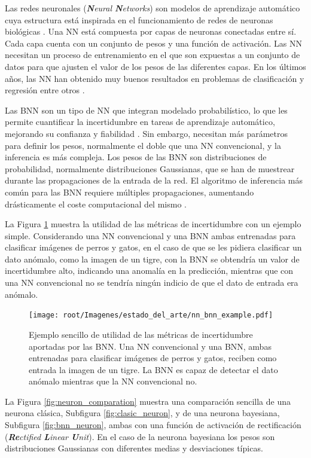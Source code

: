 Las redes neuronales (\textit{\textbf{N}eural \textbf{N}etworks}) son modelos de aprendizaje automático cuya estructura está inspirada en el funcionamiento de redes de neuronas biológicas \cite{deep_learning_nature}. Una NN está compuesta por capas de neuronas conectadas entre sí. Cada capa cuenta con un conjunto de pesos y una función de activación. Las NN necesitan un proceso de entrenamiento en el que son expuestas a un conjunto de datos para que ajusten el valor de los pesos de las diferentes capas. En los últimos años, las NN han obtenido muy buenos resultados en problemas de clasificación y regresión entre otros \cite{cnn_image_survey}.

Las BNN son un tipo de NN que integran modelado probabilístico, lo que les permite cuantificar la incertidumbre en tareas de aprendizaje automático, mejorando su confianza y fiabilidad \cite{bnn_hyper_uncertainty}. Sin embargo, necesitan más parámetros para definir los pesos, normalmente el doble que una NN convencional, y la inferencia es más compleja. Los pesos de las BNN son distribuciones de probabilidad, normalmente distribuciones Gaussianas, que se han de muestrear durante las propagaciones de la entrada de la red. El algoritmo de inferencia más común para las BNN requiere múltiples propagaciones, aumentando drásticamente el coste computacional del mismo \cite{bnn_theory_paper}.

La Figura \ref{fig:bnn_vs_nn_example} muestra la utilidad de las métricas de incertidumbre con un ejemplo simple. Considerando una NN convencional y una BNN ambas entrenadas para clasificar imágenes de perros y gatos, en el caso de que se les pidiera clasificar un dato anómalo, como la imagen de un tigre, con la BNN se obtendría un valor de incertidumbre alto, indicando una anomalía en la predicción, mientras que con una NN convencional no se tendría ningún indicio de que el dato de entrada era anómalo.

\begin{figure}[h]
	\centering
	\texttt{[image: root/Imagenes/estado\_del\_arte/nn\_bnn\_example.pdf]}
	\caption{Ejemplo sencillo de utilidad de las métricas de incertidumbre aportadas por las BNN. Una NN convencional y una BNN, ambas entrenadas para clasificar imágenes de perros y gatos, reciben como entrada la imagen de un tigre. La BNN es capaz de detectar el dato anómalo mientras que la NN convencional no.}
	\label{fig:bnn_vs_nn_example}
\end{figure}

La Figura \ref{fig:neuron_comparation} muestra una comparación sencilla de una neurona clásica, Subfigura \ref{fig:clasic_neuron}, y de una neurona bayesiana, Subfigura \ref{fig:bnn_neuron}, ambas con una función de activación de rectificación (\textit{\textbf{Re}ctified \textbf{L}inear \textbf{U}nit}). En el caso de la neurona bayesiana los pesos son distribuciones Gaussianas con diferentes medias y desviaciones típicas.

